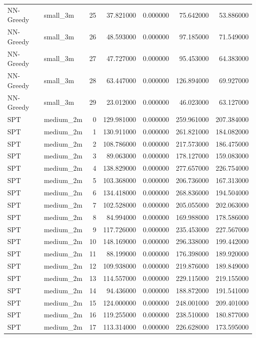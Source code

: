 \begin{tabular}{llrrrrr}
NN-Greedy & small_3m & 25 & 37.821000 & 0.000000 & 75.642000 & 53.886000 \\
NN-Greedy & small_3m & 26 & 48.593000 & 0.000000 & 97.185000 & 71.549000 \\
NN-Greedy & small_3m & 27 & 47.727000 & 0.000000 & 95.453000 & 64.383000 \\
NN-Greedy & small_3m & 28 & 63.447000 & 0.000000 & 126.894000 & 69.927000 \\
NN-Greedy & small_3m & 29 & 23.012000 & 0.000000 & 46.023000 & 63.127000 \\
SPT & medium_2m & 0 & 129.981000 & 0.000000 & 259.961000 & 207.384000 \\
SPT & medium_2m & 1 & 130.911000 & 0.000000 & 261.821000 & 184.082000 \\
SPT & medium_2m & 2 & 108.786000 & 0.000000 & 217.573000 & 186.475000 \\
SPT & medium_2m & 3 & 89.063000 & 0.000000 & 178.127000 & 159.083000 \\
SPT & medium_2m & 4 & 138.829000 & 0.000000 & 277.657000 & 226.754000 \\
SPT & medium_2m & 5 & 103.368000 & 0.000000 & 206.736000 & 167.313000 \\
SPT & medium_2m & 6 & 134.418000 & 0.000000 & 268.836000 & 194.504000 \\
SPT & medium_2m & 7 & 102.528000 & 0.000000 & 205.055000 & 202.063000 \\
SPT & medium_2m & 8 & 84.994000 & 0.000000 & 169.988000 & 178.586000 \\
SPT & medium_2m & 9 & 117.726000 & 0.000000 & 235.453000 & 227.567000 \\
SPT & medium_2m & 10 & 148.169000 & 0.000000 & 296.338000 & 199.442000 \\
SPT & medium_2m & 11 & 88.199000 & 0.000000 & 176.398000 & 189.920000 \\
SPT & medium_2m & 12 & 109.938000 & 0.000000 & 219.876000 & 189.849000 \\
SPT & medium_2m & 13 & 114.557000 & 0.000000 & 229.115000 & 219.155000 \\
SPT & medium_2m & 14 & 94.436000 & 0.000000 & 188.872000 & 191.541000 \\
SPT & medium_2m & 15 & 124.000000 & 0.000000 & 248.001000 & 209.401000 \\
SPT & medium_2m & 16 & 119.255000 & 0.000000 & 238.510000 & 180.877000 \\
SPT & medium_2m & 17 & 113.314000 & 0.000000 & 226.628000 & 173.595000 \\

\end{tabular}
